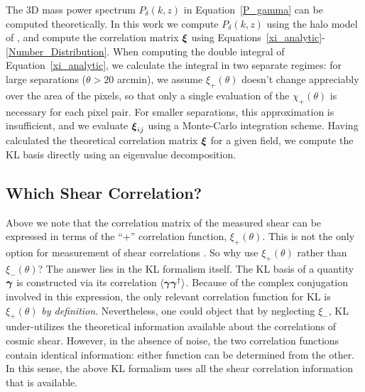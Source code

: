 The 3D mass power spectrum $P_\delta(k,z)$ in Equation~\ref{P_gamma}
can be computed theoretically.  
In this work we compute $P_\delta(k,z)$ using the halo model of 
\citet{Smith03}, and compute the correlation matrix $\boldsymbol{\xi}$ using 
Equations~\ref{xi_analytic}-\ref{Number_Distribution}.
When computing the double integral of Equation~\ref{xi_analytic},
we calculate the integral in two separate regimes:
for large separations ($\theta > 20$ arcmin), 
we assume $\xi_+(\theta)$ doesn't change appreciably over the area 
of the pixels, so that only a single evaluation of
the $\chi_+(\theta)$ is necessary for each pixel pair.  
For smaller separations, 
this approximation is insufficient, and we evaluate $\boldsymbol{\xi}_{ij}$ using
a Monte-Carlo integration scheme.  Having calculated the 
theoretical correlation matrix $\boldsymbol{\xi}$ for a given field, 
we compute the KL basis directly using an eigenvalue decomposition.

\subsection{Which Shear Correlation?}
\label{sec:WhichCorrelation}
Above we note that the correlation matrix of the measured shear 
can be expressed
in terms of the ``+'' correlation function, $\xi_+(\theta)$.  This is not
the only option for measurement of shear correlations 
\citep[see, e.g.][]{Schneider02}.  So why use $\xi_+(\theta)$ rather 
than $\xi_-(\theta)$?  The answer lies in the KL formalism itself.  The KL
basis of a quantity $\boldsymbol{\gamma}$ is constructed via its correlation
$\langle\boldsymbol{\gamma} \boldsymbol{\gamma}^\dagger\rangle$.  Because of the complex
conjugation involved in this expression, the only relevant correlation 
function for KL is $\xi_+(\theta)$ \textit{by definition}.  Nevertheless,
one could object that by neglecting $\xi_-$, 
KL under-utilizes the theoretical information available 
about the correlations of cosmic shear. However, in the absence of noise, 
the two correlation functions contain identical information: 
either function can be determined from the other.  
In this sense, the above KL formalism
uses all the shear correlation information that is available.

